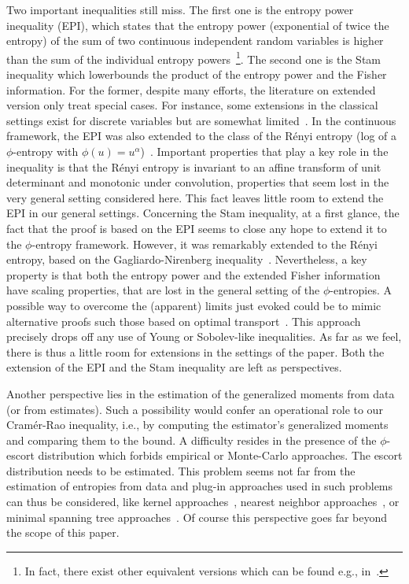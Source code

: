 \documentclass[entropy,article,submit,moreauthors,pdftex]{Definitions/mdpi}
\begin{document}
Two  important inequalities  still  miss. The  first one  is  the entropy  power
inequality (EPI), which states that the  entropy power (exponential of twice the
entropy) of  the sum of  two continuous  independent random variables  is higher
than the  sum of  the individual entropy  powers~\footnote{In fact,  there exist
other  equivalent   versions  which   can  be  found   e.g.,  in~\cite{CovTho06,
  DemCov91}.}.  The second  one is  the  Stam inequality  which lowerbounds  the
product of the entropy power and the Fisher information. For the former, despite
many efforts, the literature on extended  version only treat special cases.  For
instance, some extensions in the classical settings exist for discrete variables
but are somewhat limited~\cite{HarVig03,  JohYu10, HagAbb14}.  In the continuous
framework, the EPI was also extended to the class of the R\'enyi entropy (log of
a   $\phi$-entropy  with   $\phi(u)  =   u^\alpha$)~\cite{BobChi15}.   Important
properties that play a key role in the inequality is that the R\'enyi entropy is
invariant  to  an affine  transform  of  unit  determinant and  monotonic  under
convolution, properties  that seem lost  in the very general  setting considered
here. This fact  leaves little room to  extend the EPI in  our general settings.
Concerning the Stam  inequality, at a first  glance, the fact that  the proof is
based on  the EPI seems  to close  any hope to  extend it to  the $\phi$-entropy
framework. However, it was remarkably extended  to the R\'enyi entropy, based on
the   Gagliardo-Nirenberg    inequality~\cite{Ber12:06_1,   LutYan05,   LutLv12,
  ZozPue17}. Nevertheless, a key property is that both the entropy power and the
extended  Fisher information  have  scaling  properties, that  are  lost in  the
general  setting  of the  $\phi$-entropies.   A  possible  way to  overcome  the
(apparent) limits  just evoked could be  to mimic alternative proofs  such those
based on optimal transport~\cite{Rio17}.  This  approach precisely drops off any
use of Young  or Sobolev-like inequalities. As  far as we feel, there  is thus a
little room for extensions in the settings  of the paper.  Both the extension of
the EPI and the Stam inequality are left as perspectives.

Another perspective lies in the estimation  of the generalized moments from data
(or from estimates). Such a possibility  would confer an operational role to our
Cram\'er-Rao inequality, i.e., by  computing the estimator's generalized moments
and comparing  them to the  bound. A difficulty resides  in the presence  of the
$\phi$-escort    distribution   which    forbids   empirical    or   Monte-Carlo
approaches. The escort  distribution needs to be estimated.   This problem seems
not far from  the estimation of entropies from data  and plug-in approaches used
in such  problems can  thus be  considered, like  kernel approaches~\cite{Ros56,
  Par62,  BeiDud97}, nearest  neighbor approaches~\cite{LeoPro08,  BeiDud97}, or
minimal spanning tree approaches~\cite{HerMa02}. Of course this perspective goes
far beyond the scope of this paper.
\end{document}
